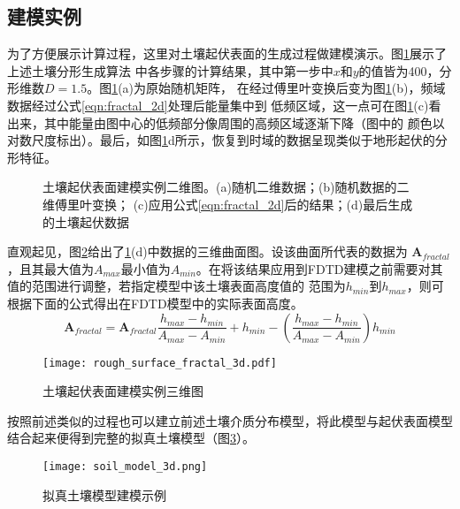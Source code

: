 \subsection{建模实例}
为了方便展示计算过程，这里对土壤起伏表面的生成过程做建模演示。图\ref{rough_surface}展示了上述土壤分形生成算法
中各步骤的计算结果，其中第一步中$x$和$y$的值皆为400，分形维数$D=1.5$。图\ref{rough_surface}(a)为原始随机矩阵，
在经过傅里叶变换后变为图\ref{rough_surface}(b)，频域数据经过公式\ref{eqn:fractal_2d}处理后能量集中到
低频区域，这一点可在图\ref{rough_surface}(c)看出来，其中能量由图中心的低频部分像周围的高频区域逐渐下降（图中的
颜色以对数尺度标出）。最后，如图\ref{rough_surface}{d}所示，恢复到时域的数据呈现类似于地形起伏的分形特征。
\begin{figure}[htbp]
	\caption{土壤起伏表面建模实例二维图。(a)随机二维数据；(b)随机数据的二维傅里叶变换；
	(c)应用公式\ref{eqn:fractal_2d}后的结果；(d)最后生成的土壤起伏数据}
	\label{rough_surface}
\end{figure}

直观起见，图\ref{rough_surface_3d}给出了\ref{rough_surface}(d)中数据的三维曲面图。设该曲面所代表的数据为
$\mathbf{A}_{fractal}$，且其最大值为$A_{max}$最小值为$A_{min}$。在将该结果应用到FDTD建模之前需要对其值的范围进行调整，若指定模型中该土壤表面高度值的
范围为$h_{min}$到$h_{max}$，则可根据下面的公式得出在FDTD模型中的实际表面高度。
\begin{equation}
	\mathbf{A}_{fractal} = \mathbf{A}_{fractal} \frac{h_{max} - h_{min}}{A_{max} - A_{min}} + 
		h_{min} - (\frac{h_{max} - h_{min}}{A_{max} - A_{min}}) h_{min}
\end{equation}
\begin{figure}[htbp]
	\texttt{[image: rough\_surface\_fractal\_3d.pdf]}
	\caption[]{土壤起伏表面建模实例三维图}
	\label{rough_surface_3d}
\end{figure}

按照前述类似的过程也可以建立前述土壤介质分布模型，将此模型与起伏表面模型结合起来便得到完整的拟真土壤模型（图\ref{soil_model_3d}）。


\begin{figure}[htbp]
	\texttt{[image: soil\_model\_3d.png]}
	\caption{拟真土壤模型建模示例}
	\label{soil_model_3d}
\end{figure}
